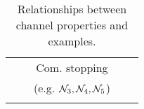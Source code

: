 \begin{table}[ht]
\begin{center}
\begin{tabular}{ccccc}
    &   &  
        \multicolumn{1}{|c|}{{\cellcolor{lightlightblue}}Com. stopping} & & 
            \\
    &   &   
        \multicolumn{1}{|c|}{{\cellcolor{lightlightblue}}(e.g. $\mathcal{N}_3,\mathcal{N}_4,\mathcal{N}_5$)} & & 
            \\
    \hhline{|~|~|-|~|~|}                 
    \end{tabular}
\vspace{2mm}
\caption{Relationships between channel properties and examples.}\label{tab:prop-rel}
 \end{center}
    
\end{table}